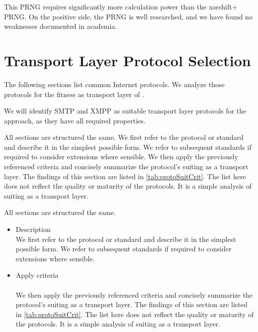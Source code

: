 This PRNG requires significantly more calculation power than the xorshift+ PRNG. On the positive side, the PRNG is well researched, and we have found no weaknesses documented in academia.


\section{Transport Layer Protocol Selection}\label{sec:transportProtocols}
The following sections list common Internet protocols. We analyze those protocols for the fitness as transport layer of \MessageVortex. 

We will identify SMTP and XMPP as suitable transport layer protocols for the \MessageVortex{} approach, as they have all required properties.

All sections are structured the same. We first refer to the protocol or standard and describe it in the simplest possible form. We refer to subsequent standards if required to consider extensions where sensible. We then apply the previously referenced criteria and concisely summarize the protocol's suiting as a transport layer. The findings of this section are listed in \cref{tab:protoSuitCrit}. The list here does not reflect the quality or maturity of the protocols. It is a simple analysis of suiting as a transport layer.

All sections are structured the same. 
\begin{itemize}
	\item Description\\ %
	We first refer to the protocol or standard and describe it in the simplest possible form. We refer to subsequent standards if required to consider extensions where sensible.
	\item Apply criteria\\\\
	We then apply the previously referenced criteria and concisely summarize the protocol's suiting as a transport layer. The findings of this section are listed in \cref{tab:protoSuitCrit}. The list here does not reflect the quality or maturity of the protocols. It is a simple analysis of suiting as a transport layer.
\end{itemize} 

